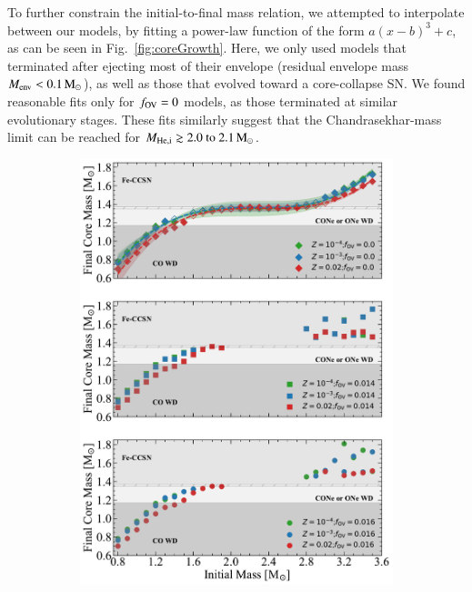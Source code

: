 \documentclass[main.tex]{subfiles}
\begin{document}
To further constrain the initial-to-final mass relation, we  attempted to interpolate between our models,  by fitting a power-law function of the form $a(x-b)^3 + c$, as can be seen in 
Fig.~\ref{fig:coreGrowth}. Here, we only used models that terminated after ejecting most of their envelope (residual envelope mass $M_{\rm env} < 0.1\mathrm{\,M_\odot}$), as well as those that evolved toward a core-collapse SN. We found reasonable fits only for  $f_{\rm OV} = 0$ models, as those terminated at similar evolutionary stages. These fits similarly suggest that the Chandrasekhar-mass limit can be reached for $M_{\rm He, i}\gtrsim \numrange{2.0}{2.1}\msun$. 

\begin{figure}[h!]
    \centering
    \begin{subfigure}{.5\textwidth}
        \centering
        \includegraphics[width=0.95\columnwidth]{figures/chapter2/core_growth/series1_coreGrowth_panel1_interpolated.pdf}
    \end{subfigure}%
    \begin{subfigure}{.5\textwidth}

\end{subfigure}
\end{figure}
\end{document}
